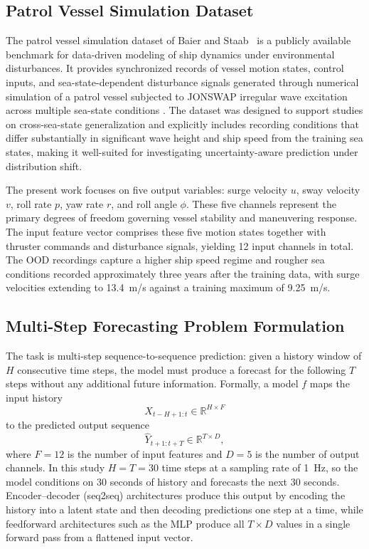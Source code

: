 \documentclass[a4paper,fleqn]{cas-sc}
\begin{document}
\subsection{Patrol Vessel Simulation Dataset}

The patrol vessel simulation dataset of Baier and Staab~\cite{baier2022darus} is a publicly available benchmark for data-driven modeling of ship dynamics under environmental disturbances. It provides synchronized records of vessel motion states, control inputs, and sea-state-dependent disturbance signals generated through numerical simulation of a patrol vessel subjected to JONSWAP irregular wave excitation \cite{pierson1964spectral, hasselmann1973jonswap} across multiple sea-state conditions \cite{baier2022darus, baier2021hybrid}. The dataset was designed to support studies on cross-sea-state generalization and explicitly includes recording conditions that differ substantially in significant wave height and ship speed from the training sea states, making it well-suited for investigating uncertainty-aware prediction under distribution shift.

The present work focuses on five output variables: surge velocity $u$, sway velocity $v$, roll rate $p$, yaw rate $r$, and roll angle $\phi$. These five channels represent the primary degrees of freedom governing vessel stability and maneuvering response. The input feature vector comprises these five motion states together with thruster commands and disturbance signals, yielding 12 input channels in total. The OOD recordings capture a higher ship speed regime and rougher sea conditions recorded approximately three years after the training data, with surge velocities extending to 13.4~m/s against a training maximum of 9.25~m/s.

\subsection{Multi-Step Forecasting Problem Formulation}

The task is multi-step sequence-to-sequence prediction: given a history window of $H$ consecutive time steps, the model must produce a forecast for the following $T$ steps without any additional future information. Formally, a model $f$ maps the input history
\[
X_{t-H+1:t} \in \mathbb{R}^{H \times F}
\]
to the predicted output sequence
\[
\hat{Y}_{t+1:t+T} \in \mathbb{R}^{T \times D},
\]
where $F=12$ is the number of input features and $D=5$ is the number of output channels. In this study $H=T=30$ time steps at a sampling rate of 1~Hz, so the model conditions on 30 seconds of history and forecasts the next 30 seconds. Encoder--decoder (seq2seq) architectures \cite{sutskever2014seq2seq} produce this output by encoding the history into a latent state and then decoding predictions one step at a time, while feedforward architectures such as the MLP produce all $T \times D$ values in a single forward pass from a flattened input vector.
\end{document}
